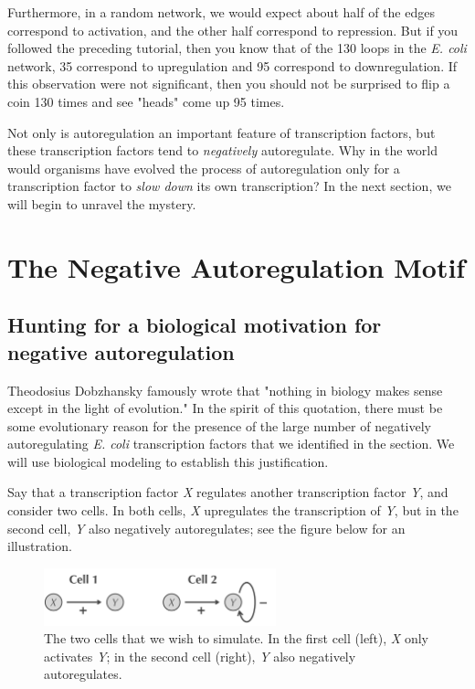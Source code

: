 Furthermore, in a random network, we would expect about half of the edges correspond to activation, and the other half correspond to repression. But if you followed the preceding tutorial, then you know that of the 130 loops in the \textit{E. coli} network, 35 correspond to upregulation and 95 correspond to downregulation. If this observation were not significant, then you should not be surprised to flip a coin 130 times and see "heads" come up 95 times.

Not only is autoregulation an important feature of transcription factors, but these transcription factors tend to \textit{negatively} autoregulate. Why in the world would organisms have evolved the process of autoregulation only for a transcription factor to \textit{slow down} its own transcription? In the next section, we will begin to unravel the mystery.


\FloatBarrier
{}

\section{The Negative Autoregulation Motif}
\label{sec:the_negative_autoregulation_motif}

\subsection{Hunting for a biological motivation for negative autoregulation}

Theodosius Dobzhansky famously wrote that "nothing in biology makes sense except in the light of evolution." In the spirit of this quotation, there must be some evolutionary reason for the presence of the large number of negatively autoregulating \textit{E. coli} transcription factors that we identified in the section. We will use biological modeling to establish this justification.

Say that a transcription factor \textit{X} regulates another transcription factor \textit{Y}, and consider two cells. In both cells, \textit{X} upregulates the transcription of \textit{Y}, but in the second cell, \textit{Y} also negatively autoregulates; see the figure below for an illustration.

\begin{figure}[h]
\centering
\mySfFamily
\includegraphics[width = 0.6\textwidth]{../images/two_cells.png}
\caption{The two cells that we wish to simulate. In the first cell (left), \textit{X} only activates \textit{Y}; in the second cell (right), \textit{Y} also negatively autoregulates.}
\label{fig:two_cells}
\end{figure}

